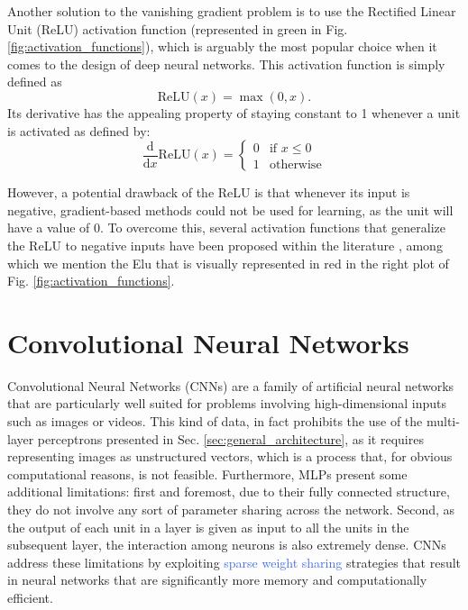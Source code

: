 Another solution to the vanishing gradient problem is to use the Rectified Linear Unit (ReLU) activation function (represented in green in Fig. \ref{fig:activation_functions}), which is arguably the most popular choice when it comes to the design of deep neural networks. This activation function is simply defined as
\begin{equation}
	\text{ReLU}(x) = \max(0,x).
\end{equation}
Its derivative has the appealing property of staying constant to 1 whenever a unit is activated as defined by: 
\begin{equation}
	\frac{\text{d}}{\text{d}x} \text{ReLU}(x) = \begin{cases} 0 & \text{if } x \leq 0 \\ 1 & \text{otherwise} \end{cases}
\end{equation}

However, a potential drawback of the ReLU is that whenever its input is negative, gradient-based methods could not be used for learning, as the unit will have a value of 0. To overcome this, several activation functions that generalize the ReLU to negative inputs have been proposed within the literature \cite{clevert2015fast, maas2013rectifier, he2015delving}, among which we mention the Elu \cite{clevert2015fast} that is visually represented in red in the right plot of Fig. \ref{fig:activation_functions}. 


\section{Convolutional Neural Networks}
\label{sec:convolutional_networks}

Convolutional Neural Networks (CNNs) are a family of artificial neural networks that are particularly well suited for problems involving high-dimensional inputs such as images or videos. This kind of data, in fact prohibits the use of the multi-layer perceptrons presented in Sec. \ref{sec:general_architecture}, as it requires representing images as unstructured vectors, which is a process that, for obvious computational reasons, is not feasible. Furthermore, MLPs present some additional limitations: first and foremost, due to their fully connected structure, they do not involve any sort of parameter sharing across the network. Second, as the output of each unit in a layer is given as input to all the units in the subsequent layer, the interaction among neurons is also extremely dense. CNNs address these limitations by exploiting \textcolor{RoyalBlue}{sparse weight sharing} strategies that result in neural networks that are significantly more memory and computationally efficient. 

